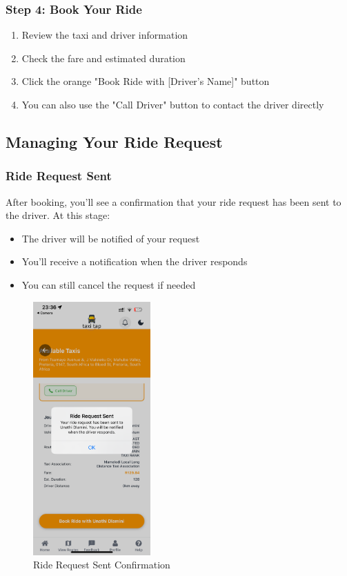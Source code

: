 \documentclass[12pt]{article}
\begin{document}
\subsubsection{Step 4: Book Your Ride}
\begin{enumerate}
    \item Review the taxi and driver information
    \item Check the fare and estimated duration
    \item Click the orange "Book Ride with [Driver's Name]" button
    \item You can also use the "Call Driver" button to contact the driver directly
\end{enumerate}

\subsection{Managing Your Ride Request}

\subsubsection{Ride Request Sent}
After booking, you'll see a confirmation that your ride request has been sent to the driver. At this stage:
\begin{itemize}
    \item The driver will be notified of your request
    \item You'll receive a notification when the driver responds
    \item You can still cancel the request if needed
\end{itemize}

\begin{figure}[H]
  \centering
  \includegraphics[width=0.4\textwidth]{ride_request_sent.png}
  \caption{Ride Request Sent Confirmation}
\end{figure}
\end{document}
